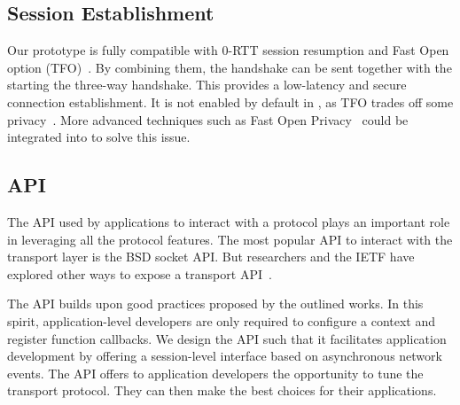 \subsection{\tcpls Session Establishment}

Our prototype is fully compatible with  0-RTT session resumption
and \tcp Fast Open option (TFO)~\cite{radhakrishnan2011tcp}. By combining them,
the \tcpls handshake can be sent together with the \tcp \syn starting
the three-way handshake. This provides a low-latency and secure connection establishment. It is not enabled by default in \tcpls, as TFO trades off some privacy~\cite{sy2020enhanced}. More advanced techniques such as \tcp Fast Open Privacy~\cite{sy2020enhanced} could be integrated into \tcpls to solve this issue.

\subsection{\tcpls API}
\label{sec-api}

The API used by applications to interact with a protocol plays an important role in leveraging all the protocol features. The most popular API to interact with the transport layer is the BSD socket API. But researchers and the IETF have explored other ways to expose a transport API~\cite{draft-ietf-taps-arch,hruby2014sockets,rfc6458,schmidt2013socket}.

The \tcpls API builds upon good practices proposed by the outlined works.
In this spirit, application-level developers are only required to configure a \tcpls context and register function callbacks. We design the \tcpls API such
that %
it facilitates application development by offering a %
session-level interface based on asynchronous network events. The \tcpls API
offers to application developers the opportunity to tune the transport
protocol. They can then make the best choices for their applications.

